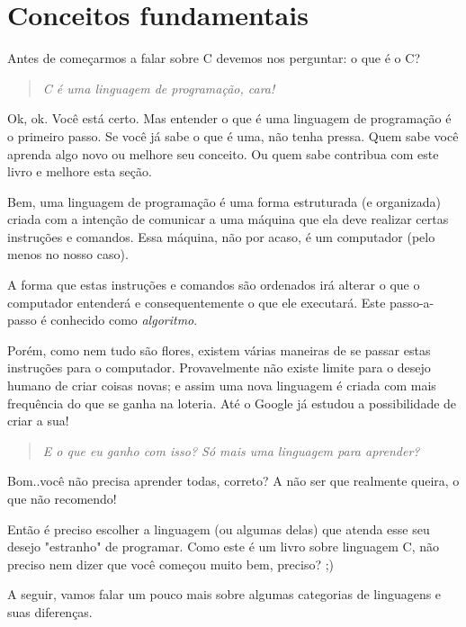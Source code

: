 

\chapter{Conceitos fundamentais}
Antes de começarmos a falar sobre C devemos nos perguntar: o que é o C?
\begin{quote}
\textit{C é uma linguagem de programação, cara!}
\end{quote}

Ok, ok. Você está certo. Mas entender o que é uma linguagem de programação é o primeiro passo. Se você já sabe o que é uma, não tenha pressa. Quem sabe você aprenda algo novo ou melhore seu conceito. Ou quem sabe contribua com este livro e melhore esta seção.

Bem, uma linguagem de programação é uma forma estruturada (e organizada) criada com a intenção de comunicar a uma máquina que ela deve realizar certas instruções e comandos. Essa máquina, não por acaso, é um computador (pelo menos no nosso caso).

A forma que estas instruções e comandos são ordenados irá alterar o que o computador entenderá e consequentemente o que ele executará. Este passo-a-passo é conhecido como \textit{algoritmo}.

Porém, como nem tudo são flores, existem várias maneiras de se passar estas instruções para o computador. Provavelmente não existe limite para o desejo humano de criar coisas novas; e assim uma nova linguagem é criada com mais frequência do que se ganha na loteria. Até o Google já estudou a possibilidade de criar a sua!

\begin{quote}
\textit{E o que eu ganho com isso? Só mais uma linguagem para aprender?}
\end{quote}

Bom..você não precisa aprender todas, correto? A não ser que realmente queira, o que não recomendo!

Então é preciso escolher a linguagem (ou algumas delas) que atenda esse seu desejo "estranho" de programar. Como este é um livro sobre linguagem C, não preciso nem dizer que você começou muito bem, preciso? ;)

A seguir, vamos falar um pouco mais sobre algumas categorias de linguagens e suas diferenças.

